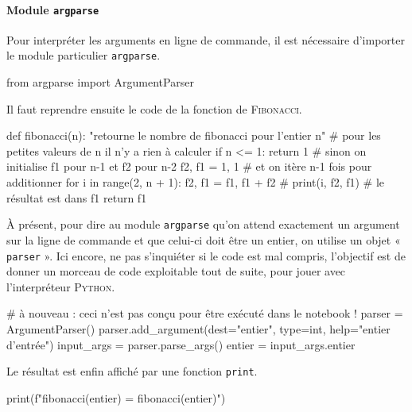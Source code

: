 \paragraph*{Module {\normalfont\texttt{argparse}}} Pour interpréter les arguments en ligne de commande, il est nécessaire d'importer le module particulier \texttt{argparse}.

\begin{nbjupyterin}[before skip=4pt, after skip=6pt]{}
from argparse import ArgumentParser
\end{nbjupyterin}

Il faut reprendre ensuite le code\marginpar{\vspace*{2.5\baselineskip}} de la fonction de \textsc{Fibonacci}.

\begin{nbjupyterin}[before skip=4pt, after skip=6pt]{}
def fibonacci(n):
    "retourne le nombre de fibonacci pour l'entier n"
    # pour les petites valeurs de n il n'y a rien à calculer
    if n <= 1:
        return 1
    # sinon on initialise f1 pour n-1 et f2 pour n-2
    f2, f1 = 1, 1
    # et on itère n-1 fois pour additionner
    for i in range(2, n + 1):
        f2, f1 = f1, f1 + f2
#        print(i, f2, f1)
    # le résultat est dans f1
    return f1
\end{nbjupyterin}

À présent, pour dire au module \texttt{argparse} qu'on attend exactement un argument sur la ligne de commande et que celui-ci doit être un entier, on utilise un objet « \texttt{parser} ». Ici encore, ne pas s'inquiéter si le code est mal compris, l'objectif est de donner un morceau de code exploitable tout de suite, pour jouer avec l'interpréteur \textsc{Python}.

\begin{nbjupyterin}[before skip=4pt, after skip=6pt]{}
# à nouveau : ceci n'est pas conçu pour être exécuté dans le notebook !
parser = ArgumentParser()
parser.add_argument(dest="entier", type=int,
                    help="entier d'entrée")
input_args = parser.parse_args()
entier = input_args.entier
\end{nbjupyterin}

Le résultat est enfin affiché par une fonction \texttt{print}.

\begin{nbjupyterin}[before skip=4pt, after skip=8pt]{}
print(f"fibonacci({entier}) = {fibonacci(entier)}")
\end{nbjupyterin}

